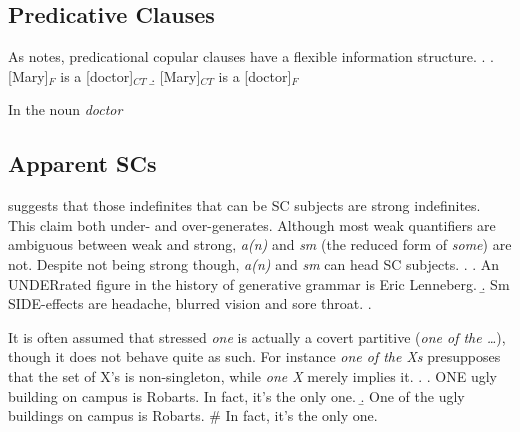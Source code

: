 \documentclass[GPFinal]{subfiles}
\begin{document}
\subsection{Predicative Clauses}
As \textcite{mikkelsen2004specifying} notes, predicational copular clauses have a flexible information structure.
\ex.
\a. [Mary]$_F$ is a [doctor]$_{CT}$
\b. [Mary]$_{CT}$ is a [doctor]$_F$

In \Last[a] the noun \textit{doctor}
\subsection{Apparent SCs}
\textcite{heycock2012specification} suggests that those indefinites that can be SC subjects are strong indefinites.
This claim both under- and over-generates.
Although most weak quantifiers are ambiguous between weak and strong, \textit{a(n)} and \textit{sm} (the reduced form of \textit{some}) are not.
Despite not being strong though, \textit{a(n)} and \textit{sm} can head SC subjects.
\ex.
\a. An UNDERrated figure in the history of generative grammar is Eric Lenneberg.
\b. Sm SIDE-effects are headache, blurred vision and sore throat.
\z.

It is often assumed that stressed \textit{one} is actually a covert partitive (\textit{one of the \ldots}), though it does not behave quite as such.
For instance \textit{one of the Xs} presupposes that the set of X's is non-singleton, while \textit{one X} merely implies it.
\ex.
\a. ONE ugly building on campus is Robarts. In fact, it's the only one.
\b. One of the ugly buildings on campus is Robarts. \# In fact, it's the only one.
\end{document}
